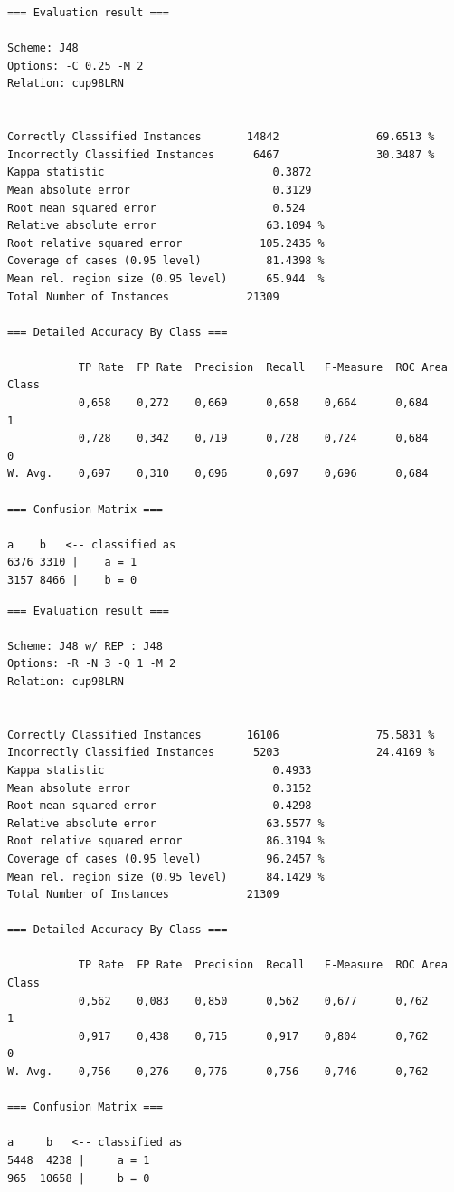 \vspace{0.7cm}
\begin{mdframed}[frametitle=J48 con pruning di default (EBP)]
\begin{verbatim}
=== Evaluation result ===

Scheme: J48
Options: -C 0.25 -M 2
Relation: cup98LRN


Correctly Classified Instances       14842               69.6513 %
Incorrectly Classified Instances      6467               30.3487 %
Kappa statistic                          0.3872
Mean absolute error                      0.3129
Root mean squared error                  0.524 
Relative absolute error                 63.1094 %
Root relative squared error            105.2435 %
Coverage of cases (0.95 level)          81.4398 %
Mean rel. region size (0.95 level)      65.944  %
Total Number of Instances            21309     

=== Detailed Accuracy By Class ===

           TP Rate  FP Rate  Precision  Recall   F-Measure  ROC Area  Class
           0,658    0,272    0,669      0,658    0,664      0,684     1
           0,728    0,342    0,719      0,728    0,724      0,684     0
W. Avg.    0,697    0,310    0,696      0,697    0,696      0,684          

=== Confusion Matrix ===

a    b   <-- classified as
6376 3310 |    a = 1
3157 8466 |    b = 0
\end{verbatim}
\end{mdframed}

\vspace{0.11cm}
\begin{mdframed}[frametitle=J48 con pruning effettuato da REP]
\begin{verbatim}
=== Evaluation result ===

Scheme: J48 w/ REP : J48
Options: -R -N 3 -Q 1 -M 2
Relation: cup98LRN


Correctly Classified Instances       16106               75.5831 %
Incorrectly Classified Instances      5203               24.4169 %
Kappa statistic                          0.4933
Mean absolute error                      0.3152
Root mean squared error                  0.4298
Relative absolute error                 63.5577 %
Root relative squared error             86.3194 %
Coverage of cases (0.95 level)          96.2457 %
Mean rel. region size (0.95 level)      84.1429 %
Total Number of Instances            21309     

=== Detailed Accuracy By Class ===

           TP Rate  FP Rate  Precision  Recall   F-Measure  ROC Area  Class
           0,562    0,083    0,850      0,562    0,677      0,762     1
           0,917    0,438    0,715      0,917    0,804      0,762     0
W. Avg.    0,756    0,276    0,776      0,756    0,746      0,762          

=== Confusion Matrix ===

a     b   <-- classified as
5448  4238 |     a = 1
965  10658 |     b = 0
\end{verbatim}
\end{mdframed}

